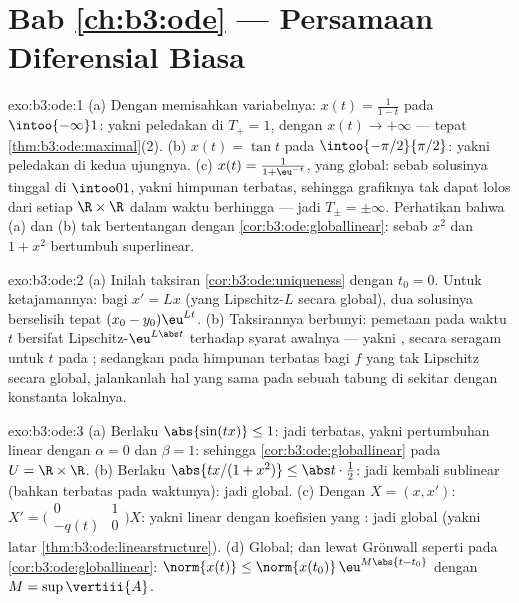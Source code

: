 \section*{Bab \ref{ch:b3:ode} --- Persamaan Diferensial
Biasa}

\begin{solution}{exo:b3:ode:1}
(a) Dengan memisahkan variabelnya: $x(t) = \frac1{1 - t}$ pada
$\intoo{-\infty}1$: yakni peledakan di $T_+ = 1$, dengan $x(t) \to
+\infty$ --- tepat \cref{thm:b3:ode:maximal}(2).
(b) $x(t) = \tan t$ pada $\intoo{-\pi/2}{\pi/2}$: yakni peledakan di
kedua ujungnya.
(c) $x(t) = \frac{1}{1 + \eu^{-t}}$, yang global: sebab solusinya
tinggal di $\intoo01$, yakni himpunan terbatas, sehingga grafiknya tak dapat
lolos dari setiap  $\R\times\R$ dalam waktu berhingga --- jadi $T_\pm
= \pm\infty$. Perhatikan bahwa (a) dan (b) tak bertentangan dengan
\cref{cor:b3:ode:globallinear}: sebab $x^2$ dan $1 + x^2$ bertumbuh
superlinear.
\end{solution}

\begin{solution}{exo:b3:ode:2}
(a) Inilah taksiran \cref{cor:b3:ode:uniqueness} dengan $t_0
= 0$. Untuk ketajamannya: bagi $x' = Lx$ (yang Lipschitz-$L$ secara global), dua
solusinya berselisih tepat $(x_0 - y_0)\eu^{Lt}$.
(b) Taksirannya berbunyi: pemetaan  pada waktu $t$ bersifat
Lipschitz-$\eu^{L\abs t}$ terhadap syarat awalnya ---
yakni , secara seragam untuk $t$ pada ; sedangkan pada himpunan terbatas
bagi $f$ yang tak Lipschitz secara global, jalankanlah hal yang sama pada sebuah tabung 
di sekitar  dengan konstanta lokalnya.
\end{solution}

\begin{solution}{exo:b3:ode:3}
(a) Berlaku $\abs{\sin(tx)} \leq 1$: jadi terbatas, yakni pertumbuhan linear dengan
$\alpha = 0$ dan $\beta = 1$: sehingga \cref{cor:b3:ode:globallinear} pada
$U = \R\times\R$.
(b) Berlaku $\abs{tx/(1 + x^2)} \leq \abs t\cdot\frac12$: jadi kembali
sublinear (bahkan terbatas pada  waktunya): jadi global.
(c) Dengan $X = (x, x')$: $X' = \bigl(\begin{smallmatrix}0 & 1\\ -q(t)
& 0\end{smallmatrix}\bigr)X$: yakni linear dengan koefisien yang
: jadi global (yakni latar
\cref{thm:b3:ode:linearstructure}).
(d) Global; dan lewat Grönwall seperti pada \cref{cor:b3:ode:globallinear}:
$\norm{x(t)} \leq \norm{x(t_0)}\,\eu^{M\abs{t - t_0}}$ dengan
$M = \sup\vertiii{A}$.
\end{solution}

